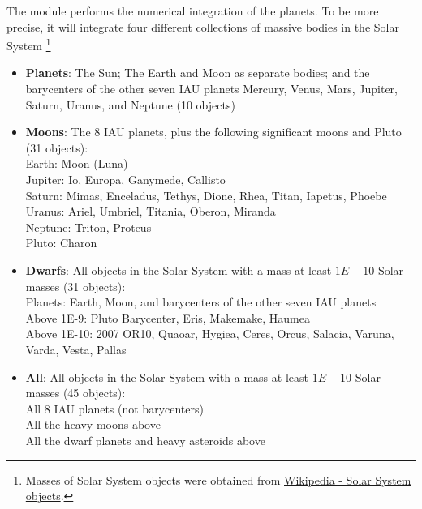 The module  performs the numerical integration of the planets.
To be more precise, it will integrate four different collections of massive bodies in the Solar System
\footnote{Masses of Solar System objects were obtained from \href{https://en.wikipedia.org/wiki/List_of_Solar_System_objects_by_size}{Wikipedia - Solar System objects}.}
\begin{itemize}
\item \textbf{Planets}: The Sun; The Earth and Moon as separate bodies; and the barycenters of the other seven IAU planets 
Mercury, Venus, Mars, Jupiter, Saturn, Uranus, and Neptune (10 objects)
\item \textbf{Moons}: The 8 IAU planets, plus the following significant moons and Pluto (31 objects): \\
Earth: Moon (Luna)\\
Jupiter: Io, Europa, Ganymede, Callisto \\
Saturn: Mimas, Enceladus, Tethys, Dione, Rhea, Titan, Iapetus, Phoebe \\
Uranus: Ariel, Umbriel, Titania, Oberon, Miranda \\
Neptune: Triton, Proteus \\
Pluto: Charon 
\item \textbf{Dwarfs}: All objects in the Solar System with a mass at least $1E-10$ Solar masses (31 objects): \\
Planets: Earth, Moon, and barycenters of the other seven IAU planets \\
Above 1E-9: Pluto Barycenter, Eris, Makemake, Haumea \\
Above 1E-10: 2007 OR10, Quaoar, Hygiea, Ceres, Orcus, Salacia, Varuna, Varda, Vesta, Pallas
\item \textbf{All}: All objects in the Solar System with a mass at least $1E-10$ Solar masses (45 objects): \\
All 8 IAU planets (not barycenters) \\
All the heavy moons above \\
All the dwarf planets and heavy asteroids above
\end{itemize}

